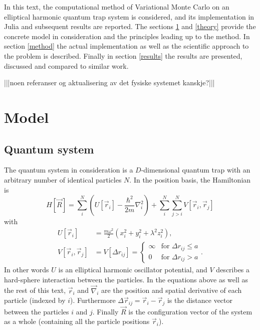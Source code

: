 \documentclass[a4paper,8pt]{article}
\begin{document}
\begin{multicols}{2}
In this text, the computational method of Variational Monte Carlo on an elliptical harmonic quantum trap system is considered, and its implementation in Julia and subsequent results are reported. The sections \ref{model} and \ref{theory} provide the concrete model in consideration and the principles leading up to the method. In section \ref{method} the actual implementation as well as the scientific approach to the problem is described. Finally in section \ref{results} the results are presented, discussed and compared to similar work.

|||noen referanser og aktualisering av det fysiske systemet kanskje?|||


\section{Model} \label{model}

\subsection{Quantum system} \label{system}
The quantum system in consideration is a $D$-dimensional quantum trap with an arbitrary number of identical particles $N$. In the position basis, the Hamiltonian is
\begin{equation}
H[\vec{R}] = \sum\limits_i^N \left(U[\vec{r}_i] -\frac{\hbar^2}{2m}\nabla_i^2 \right) + \sum\limits_i^N\sum\limits_{j > i}^N V[\vec{r}_i,\vec{r}_j]
\end{equation}
with
\begin{align}
U[\vec{r}_i] &= \frac{m\omega^2}{2}\left(x_i^2+y_i^2+\lambda^2z_i^2\right), \\
V[\vec{r}_i,\vec{r}_j] &= V[\Delta{r}_{ij}] =\begin{cases} \infty & \text{for $\Delta{r}_{ij} \leq a$} \\
0 & \text{for $\Delta{r}_{ij} > a$} \end{cases}.
\end{align}
In other words $U$ is an elliptical harmonic oscillator potential, and $V$ describes a hard-sphere interaction between the particles. In the equations above as well as the rest of this text, $\vec{r}_i$ and $\vec{\nabla}_i$ are the position and spatial derivative of each particle (indexed by $i$). Furthermore $\Delta\vec{r}_{ij} = \vec{r}_i-\vec{r}_j$ is the distance vector between the particles $i$ and $j$. Finally $\vec{R}$ is the configuration vector of the system as a whole (containing all the particle positions $\vec{r}_i$).


\end{multicols}
\end{document}
